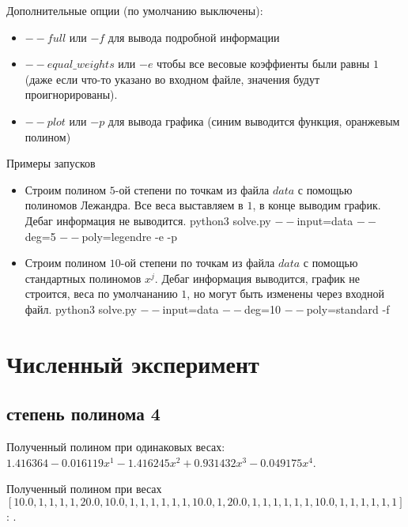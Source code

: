 \documentclass[paper=a4, fontsize=11pt]{scrartcl} %
\numberwithin{equation}{section} %
\numberwithin{figure}{section} %
\numberwithin{table}{section} %
\begin{document}
Дополнительные опции (по умолчанию выключены):

\begin{itemize}
	\item $--full$ или $-f$ для вывода подробной информации 
    \item $--equal\_weights$ или $-e$ чтобы все весовые коэффиенты были равны $1$ (даже если что-то указано во входном файле, значения будут проигнорированы).
    \item $--plot$ или $-p$ для вывода графика (синим выводится функция, оранжевым полином)
\end{itemize}

Примеры запусков

\begin{itemize}

	\item Строим полином $5$-ой степени по точкам из файла $data$ с помощью полиномов Лежандра. Все веса выставляем в $1$, в конце выводим график. Дебаг информация не выводится.
	\subitem python3 solve.py $--$input=data $--$deg=5 $--$poly=legendre -e -p 
    
    \item Строим полином $10$-ой степени по точкам из файла $data$ с помощью стандартных полиномов $x^j$. Дебаг информация выводится, график не строится, веса по умолчананию $1$, но могут быть изменены через входной файл.
	\subitem python3 solve.py $--$input=data $--$deg=10 $--$poly=standard -f


\end{itemize}


\section{Численный эксперимент}

\subsection{степень полинома 4}

Полученный полином при одинаковых весах: $1.416364-0.016119x^1-1.416245x^2+0.931432x^3-0.049175x^{4}$.

Полученный полином при весах $[10.0, 1, 1, 1, 1, 20.0, 10.0, 1, 1, 1, 1, 1, 1, 10.0, 1, 20.0, 1, 1, 1, 1, 1, 1, 10.0, 1, 1, 1, 1, 1, 1]$: .
\end{document}
